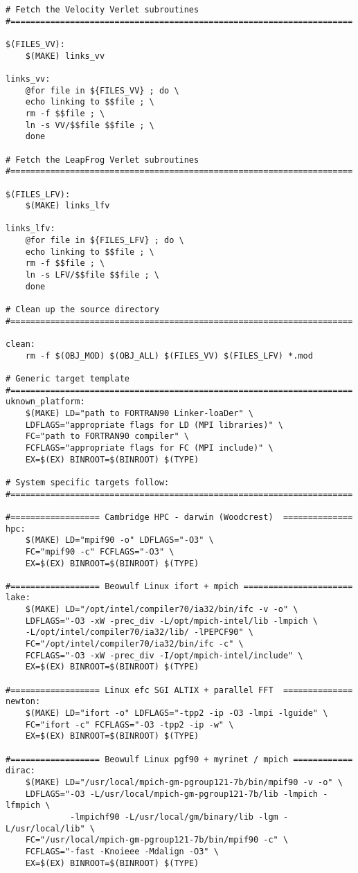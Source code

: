 \begin{verbatim}
# Fetch the Velocity Verlet subroutines
#=====================================================================

$(FILES_VV):
	$(MAKE) links_vv

links_vv:
	@for file in ${FILES_VV} ; do \
	echo linking to $$file ; \
	rm -f $$file ; \
	ln -s VV/$$file $$file ; \
	done

# Fetch the LeapFrog Verlet subroutines
#=====================================================================

$(FILES_LFV):
	$(MAKE) links_lfv

links_lfv:
	@for file in ${FILES_LFV} ; do \
	echo linking to $$file ; \
	rm -f $$file ; \
	ln -s LFV/$$file $$file ; \
	done

# Clean up the source directory
#=====================================================================

clean:
	rm -f $(OBJ_MOD) $(OBJ_ALL) $(FILES_VV) $(FILES_LFV) *.mod

# Generic target template
#=====================================================================
uknown_platform:
	$(MAKE) LD="path to FORTRAN90 Linker-loaDer" \
	LDFLAGS="appropriate flags for LD (MPI libraries)" \
	FC="path to FORTRAN90 compiler" \
	FCFLAGS="appropriate flags for FC (MPI include)" \
	EX=$(EX) BINROOT=$(BINROOT) $(TYPE)

# System specific targets follow:
#=====================================================================

#================== Cambridge HPC - darwin (Woodcrest)  ==============
hpc:
	$(MAKE) LD="mpif90 -o" LDFLAGS="-O3" \
	FC="mpif90 -c" FCFLAGS="-O3" \
	EX=$(EX) BINROOT=$(BINROOT) $(TYPE)

#================== Beowulf Linux ifort + mpich ======================
lake:
	$(MAKE) LD="/opt/intel/compiler70/ia32/bin/ifc -v -o" \
	LDFLAGS="-O3 -xW -prec_div -L/opt/mpich-intel/lib -lmpich \
	-L/opt/intel/compiler70/ia32/lib/ -lPEPCF90" \
	FC="/opt/intel/compiler70/ia32/bin/ifc -c" \
	FCFLAGS="-O3 -xW -prec_div -I/opt/mpich-intel/include" \
	EX=$(EX) BINROOT=$(BINROOT) $(TYPE)

#================== Linux efc SGI ALTIX + parallel FFT  ==============
newton:
	$(MAKE) LD="ifort -o" LDFLAGS="-tpp2 -ip -O3 -lmpi -lguide" \
	FC="ifort -c" FCFLAGS="-O3 -tpp2 -ip -w" \
	EX=$(EX) BINROOT=$(BINROOT) $(TYPE)

#================== Beowulf Linux pgf90 + myrinet / mpich ============
dirac:
	$(MAKE) LD="/usr/local/mpich-gm-pgroup121-7b/bin/mpif90 -v -o" \
	LDFLAGS="-O3 -L/usr/local/mpich-gm-pgroup121-7b/lib -lmpich -lfmpich \
	         -lmpichf90 -L/usr/local/gm/binary/lib -lgm -L/usr/local/lib" \
	FC="/usr/local/mpich-gm-pgroup121-7b/bin/mpif90 -c" \
	FCFLAGS="-fast -Knoieee -Mdalign -O3" \
	EX=$(EX) BINROOT=$(BINROOT) $(TYPE)


\end{verbatim}
